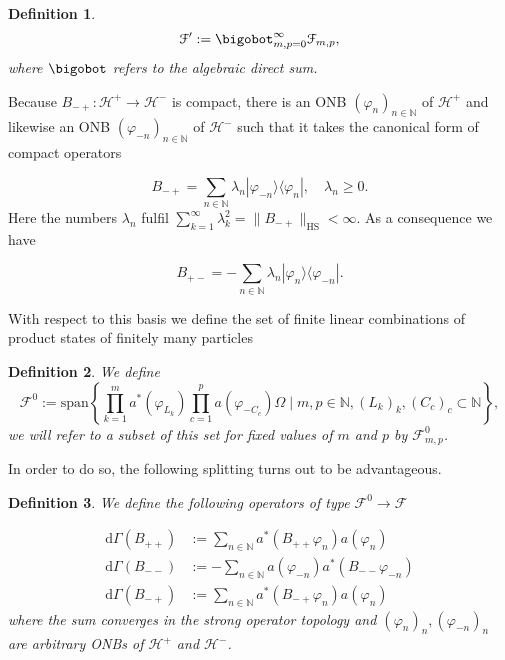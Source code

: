 \documentclass[b5paper,draft,openbib,12pt]{memoir}
\newtheorem{Def}{Definition}
\begin{document}
\begin{Def}
\begin{equation}
\mathcal{F}':=\bigobot_{m,p=0}^\infty \mathcal{F}_{m,p},
\end{equation}
where \(\bigobot\) refers to the algebraic direct sum.
\end{Def}
Because \(B_{-+}:\mathcal{H}^+\rightarrow \mathcal{H}^-\) is compact, there is an ONB \((\varphi_n)_{n\in\mathbb{N}}\) 
of \(\mathcal{H}^+\) and likewise an ONB \((\varphi_{-n})_{n\in\mathbb{N}}\) of \(\mathcal{H}^-\) such that it takes the canonical form 
of compact operators

\begin{equation}
B_{-+} = \sum_{n\in\mathbb{N}} \lambda_n |\varphi_{-n}\rangle \langle \varphi_{n}|, \quad \lambda_n \ge 0.
\end{equation}
Here the numbers \(\lambda_n\) fulfil \(\sum_{k=1}^\infty \lambda_k^2 = \|B_{-+}\|_{\text{HS}}<\infty\). As a consequence we have

\begin{equation}
B_{+-} = -\sum_{n\in\mathbb{N}} \lambda_n |\varphi_{n}\rangle \langle \varphi_{-n}|.
\end{equation}

With respect to this basis we define the set of finite linear combinations of product states of finitely many particles

\begin{Def}
We define
\begin{equation}
\mathcal{F}^0\!\!:=\! \mathrm{span}\!\! \left\{\prod_{k=1}^m \!a^*\!(\varphi_{L_k}\!)\!\prod_{c=1}^p\!\! a(\varphi_{-C_c})\Omega\mid m,p\!\in\!\!\mathbb{N}, (L_k)_k,\!(C_c)_c\!\subset\!\mathbb{N} \!\right\}\!,
\end{equation}
we will refer to a subset of this set for fixed values of \(m\) and \(p\) by \(\mathcal{F}^0_{m,p}\).
\end{Def}

In order to do so, the following splitting turns out to be advantageous. 

\begin{Def}
We define the following operators of type \(\mathcal{F}^0\rightarrow \mathcal{F}\)

\begin{align}\label{predefdGamma}
\mathrm{d}\Gamma(B_{++})&:= \sum_{n\in\mathbb{N}}  a^*(B_{++} \varphi_n) a(\varphi_n) \\
\mathrm{d}\Gamma(B_{--})&:= -\sum_{n\in\mathbb{N}}   a(\varphi_{-n})a^*(B_{--} \varphi_{-n}) \\
\mathrm{d}\Gamma(B_{-+})&:= \sum_{n\in\mathbb{N}}  a^*(B_{-+}\varphi_{n}) a(\varphi_n)
\end{align}
where the sum converges in the strong operator topology and \((\varphi_n)_n , (\varphi_{-n})_n\) are arbitrary ONBs of \(\mathcal{H}^+\) and \(\mathcal{H}^-\).
\end{Def}
\end{document}
